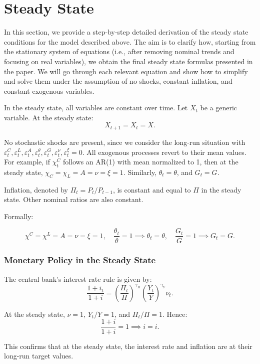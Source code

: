 \documentclass[12pt]{article}
\begin{document}
\section{Steady State}

In this section, we provide a step-by-step detailed derivation of the steady state conditions for the model described above. The aim is to clarify how, starting from the stationary system of equations (i.e., after removing nominal trends and focusing on real variables), we obtain the final steady state formulas presented in the paper. We will go through each relevant equation and show how to simplify and solve them under the assumption of no shocks, constant inflation, and constant exogenous variables.

In the steady state, all variables are constant over time. Let $X_t$ be a generic variable. At the steady state:
\[
X_{t+1} = X_t = X.
\]

No stochastic shocks are present, since we consider the long-run situation with $\varepsilon_t^C, \varepsilon_t^L, \varepsilon_t^A, \varepsilon_t^\theta, \varepsilon_t^G, \varepsilon_t^\nu, \varepsilon_t^\xi = 0$. All exogenous processes revert to their mean values. For example, if $\chi_t^C$ follows an AR(1) with mean normalized to 1, then at the steady state, $\chi_C = \chi_L = A = \nu = \xi = 1$. Similarly, $\theta_t = \theta$, and $G_t = G$.

Inflation, denoted by $\Pi_t = P_t / P_{t-1}$, is constant and equal to $\Pi$ in the steady state. Other nominal ratios are also constant.

Formally:

\[
\chi^C = \chi^L = A = \nu = \xi = 1, \quad \frac{\theta_t}{\theta}=1 \implies \theta_t=\theta, \quad \frac{G_t}{G}=1 \implies G_t=G.
\]


\subsubsection{Monetary Policy in the Steady State}

The central bank's interest rate rule is given by:
\[
\frac{1+i_t}{1+i} = \left(\frac{\Pi_t}{\Pi}\right)^{\gamma_\Pi}\left(\frac{Y_t}{Y}\right)^{\gamma_Y}\nu_t.
\]

At the steady state, $\nu=1$, $Y_t/Y=1$, and $\Pi_t/\Pi=1$. Hence:
\[
\frac{1+i}{1+i}=1 \implies i=i.
\]

This confirms that at the steady state, the interest rate and inflation are at their long-run target values.
\end{document}
